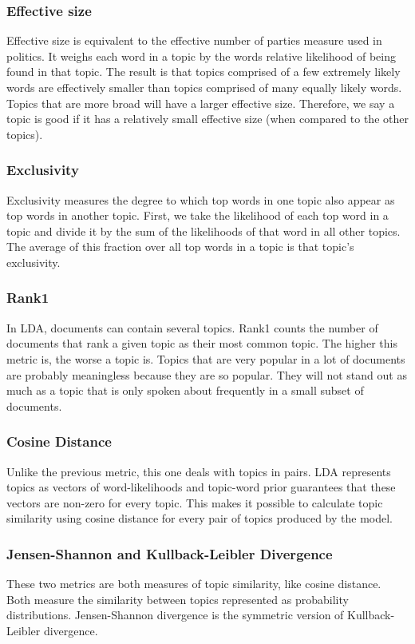\documentclass[letterpaper, 10 pt, conference]{ieeeconf}  %
\begin{document}
\subsubsection{Effective size} Effective size is equivalent to the effective number of parties measure used in politics. It weighs each word in a topic by the words relative likelihood of being found in that topic. The result is that topics comprised of a few extremely likely words are effectively smaller than topics comprised of many equally likely words. Topics that are more broad will have a larger effective size. Therefore, we say a topic is good if it has a relatively small effective size (when compared to the other topics).

\subsubsection{Exclusivity} Exclusivity measures the degree to which top words in one topic also appear as top words in another topic. First, we take the likelihood of each top word in a topic and divide it by the sum of the likelihoods of that word in all other topics. The average of this fraction over all top words in a topic is that topic’s exclusivity.

\subsubsection{Rank1} In LDA, documents can contain several topics. Rank1 counts the number of documents that rank a given topic as their most common topic. The higher this metric is, the worse a topic is. Topics that are very popular in a lot of documents are probably meaningless because they are so popular. They will not stand out as much as a topic that is only spoken about frequently in a small subset of documents.

\subsubsection{Cosine Distance} Unlike the previous metric, this one deals with topics in pairs. LDA represents topics as vectors of word-likelihoods and topic-word prior guarantees that these vectors are non-zero for every topic. This makes it possible to calculate topic similarity using cosine distance for every pair of topics produced by the model.

\subsubsection{Jensen-Shannon and Kullback-Leibler Divergence} These two metrics are both measures of topic similarity, like cosine distance. Both measure the similarity between topics represented as probability distributions. Jensen-Shannon divergence is the symmetric version of Kullback-Leibler divergence.
\end{document}
